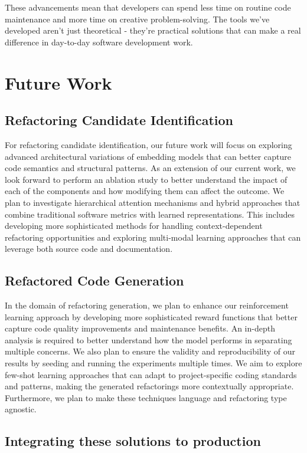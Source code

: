 These advancements mean that developers can spend less time on routine code maintenance and more time on creative problem-solving. The tools we've developed aren't just theoretical - they're practical solutions that can make a real difference in day-to-day software development work.


\section{Future Work}

\subsection{Refactoring Candidate Identification}

For refactoring candidate identification, our future work will focus on exploring advanced architectural variations of embedding models that can better capture code semantics and structural patterns. As an extension of our current work, we look forward to perform an ablation study to better understand the impact of each of the components and how modifying them can affect the outcome. We plan to investigate hierarchical attention mechanisms and hybrid approaches that combine traditional software metrics with learned representations. This includes developing more sophisticated methods for handling context-dependent refactoring opportunities and exploring multi-modal learning approaches that can leverage both source code and documentation. 

\subsection{Refactored Code Generation}

In the domain of refactoring generation, we plan to enhance our reinforcement learning approach by developing more sophisticated reward functions that better capture code quality improvements and maintenance benefits. An in-depth analysis is required to better understand how the model performs in separating multiple concerns. We also plan to ensure the validity and reproducibility of our results by seeding and running the experiments multiple times. We aim to explore few-shot learning approaches that can adapt to project-specific coding standards and patterns, making the generated refactorings more contextually appropriate. Furthermore, we plan to make these techniques language and refactoring type agnostic.

\subsection{Integrating these solutions to production}

